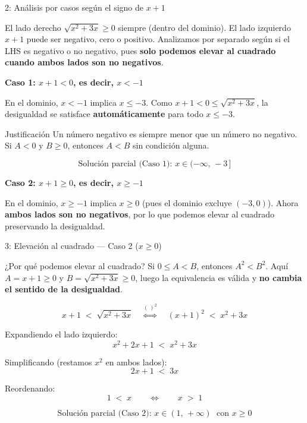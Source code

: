 \documentclass[letterpaper, 12pt]{article}
\begin{document}
\begin{paso}{2: An\'alisis por casos seg\'un el signo de $x + 1$}

El lado derecho $\sqrt{x^2+3x} \geq 0$ siempre (dentro del dominio).
El lado izquierdo $x + 1$ puede ser negativo, cero o positivo.
Analizamos por separado seg\'un si el LHS es negativo o no negativo,
pues \textbf{solo podemos elevar al cuadrado cuando ambos lados son no negativos}.

\bigskip
\textbf{Caso 1: $x + 1 < 0$, es decir, $x < -1$}

\medskip
En el dominio, $x < -1$ implica $x \leq -3$.
Como $x + 1 < 0 \leq \sqrt{x^2+3x}$, la desigualdad se satisface
\textbf{autom\'aticamente} para todo $x \leq -3$.

\begin{justif}{Justificaci\'on}
    Un n\'umero negativo es siempre menor que un n\'umero no negativo.
    Si $A < 0$ y $B \geq 0$, entonces $A < B$ sin condici\'on alguna.
\end{justif}

\[
    \text{Soluci\'on parcial (Caso 1): } x \in (-\infty,\,-3\,]
\]

\bigskip
\textbf{Caso 2: $x + 1 \geq 0$, es decir, $x \geq -1$}

\medskip
En el dominio, $x \geq -1$ implica $x \geq 0$ (pues el dominio excluye
$(-3, 0)$).
Ahora \textbf{ambos lados son no negativos}, por lo que podemos elevar al
cuadrado preservando la desigualdad.

\end{paso}

\bigskip

\begin{paso}{3: Elevaci\'on al cuadrado --- Caso 2 ($x \geq 0$)}

\begin{justif}{¿Por qu\'e podemos elevar al cuadrado?}
    Si $0 \leq A < B$, entonces $A^2 < B^2$.
    Aqu\'i $A = x+1 \geq 0$ y $B = \sqrt{x^2+3x} \geq 0$,
    luego la equivalencia es v\'alida y \textbf{no cambia el sentido
    de la desigualdad}.
\end{justif}

\[
    x + 1 \;<\; \sqrt{x^2 + 3x}
    \quad\stackrel{(\,)^2}{\Longleftrightarrow}\quad
    (x+1)^2 \;<\; x^2 + 3x
\]

Expandiendo el lado izquierdo:
\[
    x^2 + 2x + 1 \;<\; x^2 + 3x
\]

Simplificando (restamos $x^2$ en ambos lados):
\[
    2x + 1 \;<\; 3x
\]

Reordenando:
\[
    1 \;<\; x \qquad\Longleftrightarrow\qquad x \;>\; 1
\]

\[
    \text{Soluci\'on parcial (Caso 2): } x \in (1,\,+\infty) \;\text{ con } x \geq 0
\]

\end{paso}
\end{document}
